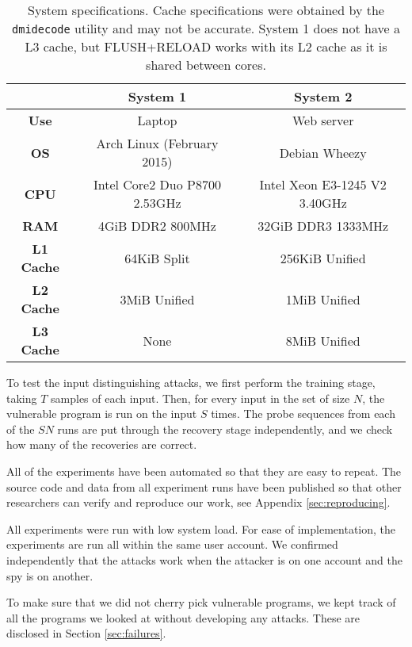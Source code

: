 \documentclass[letterpaper,twocolumn,10pt]{article}
\begin{document}
\begin{table*}
    \centering
\begin{tabular}{|c|c|c|}
    \hline
    & \textbf{System 1} & \textbf{System 2} \\
    \hline
    \textbf{Use} & Laptop & Web server \\
    \hline
    \textbf{OS} & Arch Linux (February 2015) & Debian Wheezy \\
    \hline
    \textbf{CPU} & Intel Core2 Duo P8700 2.53GHz & Intel Xeon E3-1245 V2 3.40GHz  \\
    \hline
    \textbf{RAM} & 4GiB DDR2 800MHz & 32GiB DDR3 1333MHz \\
    \hline
    \textbf{L1 Cache} & 64KiB Split & 256KiB Unified \\
    \hline
    \textbf{L2 Cache} & 3MiB Unified & 1MiB Unified \\
    \hline
    \textbf{L3 Cache} & None & 8MiB Unified \\
    \hline
\end{tabular}
\caption{System specifications. Cache specifications were obtained by the
\texttt{dmidecode} utility and may not be accurate. System 1 does not have a L3
cache, but FLUSH+RELOAD works with its L2 cache as it is shared between cores.}
\label{table:specs}
\end{table*}

To test the input distinguishing attacks, we first perform the training stage,
taking $T$ samples of each input. Then, for every input in the set of size $N$,
the vulnerable program is run on the input $S$ times. The probe sequences from
each of the $SN$ runs are put through the recovery stage independently, and we
check how many of the recoveries are correct.

All of the experiments have been automated so that they are easy to repeat. The
source code and data from all experiment runs have been published so that other
researchers can verify and reproduce our work, see Appendix
\ref{sec:reproducing}.

All experiments were run with low system load. For ease of implementation, the
experiments are run all within the same user account. We confirmed independently
that the attacks work when the attacker is on one account and the spy is on
another.

To make sure that we did not cherry pick vulnerable programs, we kept track of
all the programs we looked at without developing any attacks. These are
disclosed in Section \ref{sec:failures}.
\end{document}
